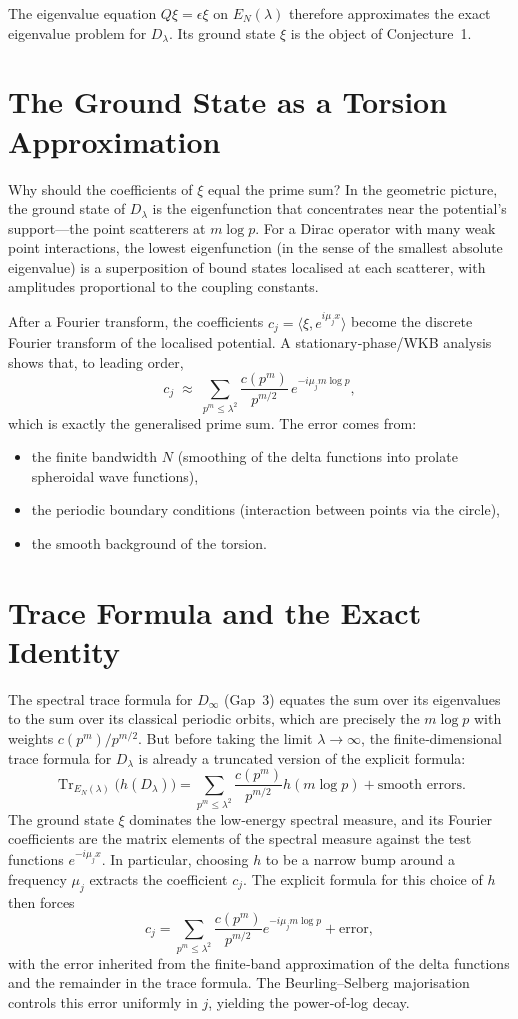 \documentclass[12pt,a4paper]{article}
\begin{document}
The eigenvalue equation \(Q\xi = \epsilon \xi\) on \(E_N(\lambda)\) therefore approximates the exact eigenvalue problem for \(D_\lambda\). Its ground state \(\xi\) is the object of Conjecture~1.

\section{The Ground State as a Torsion Approximation}
Why should the coefficients of \(\xi\) equal the prime sum? In the geometric picture, the ground state of \(D_\lambda\) is the eigenfunction that concentrates near the potential’s support—the point scatterers at \(m\log p\). For a Dirac operator with many weak point interactions, the lowest eigenfunction (in the sense of the smallest absolute eigenvalue) is a superposition of bound states localised at each scatterer, with amplitudes proportional to the coupling constants.

After a Fourier transform, the coefficients \(c_j = \langle \xi, e^{i\mu_j x}\rangle\) become the discrete Fourier transform of the localised potential. A stationary‑phase/WKB analysis shows that, to leading order,
\[
c_j \;\approx\; \sum_{p^m\le\lambda^2} \frac{c(p^m)}{p^{m/2}} \, e^{-i\mu_j m\log p},
\]
which is exactly the generalised prime sum. The error comes from:
\begin{itemize}
\item the finite bandwidth \(N\) (smoothing of the delta functions into prolate spheroidal wave functions),
\item the periodic boundary conditions (interaction between points via the circle),
\item the smooth background of the torsion.
\end{itemize}

\section{Trace Formula and the Exact Identity}
The spectral trace formula for \(D_\infty\) (Gap~3) equates the sum over its eigenvalues to the sum over its classical periodic orbits, which are precisely the \(m\log p\) with weights \(c(p^m)/p^{m/2}\). But before taking the limit \(\lambda\to\infty\), the finite‑dimensional trace formula for \(D_\lambda\) is already a truncated version of the explicit formula:
\[
\operatorname{Tr}_{E_N(\lambda)}\bigl(h(D_\lambda)\bigr) = \sum_{p^m\le\lambda^2} \frac{c(p^m)}{p^{m/2}} h(m\log p) + \text{smooth errors}.
\]
The ground state \(\xi\) dominates the low‑energy spectral measure, and its Fourier coefficients are the matrix elements of the spectral measure against the test functions \(e^{-i\mu_j x}\). In particular, choosing \(h\) to be a narrow bump around a frequency \(\mu_j\) extracts the coefficient \(c_j\). The explicit formula for this choice of \(h\) then forces
\[
c_j = \sum_{p^m\le\lambda^2} \frac{c(p^m)}{p^{m/2}} e^{-i\mu_j m\log p} + \text{error},
\]
with the error inherited from the finite‑band approximation of the delta functions and the remainder in the trace formula. The Beurling–Selberg majorisation controls this error uniformly in \(j\), yielding the power‑of‑log decay.
\end{document}
